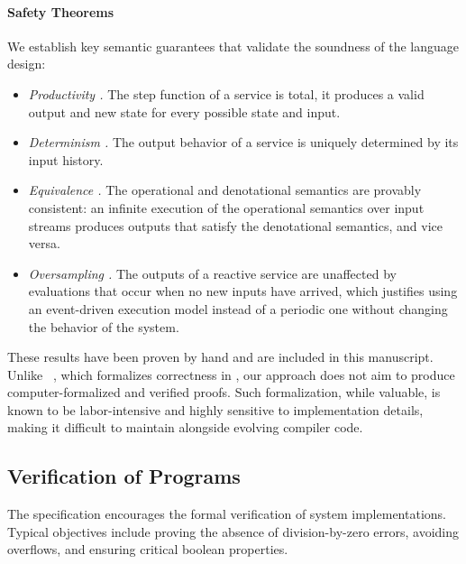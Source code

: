 \paragraph{Safety Theorems}
\label{sec:intro:contrib:semantics:thms}

We establish key semantic guarantees that validate the soundness of the language design:
%
\begin{itemize}
    \item \emph{Productivity .} The step function of
          a service is total, it produces a valid output and new state for every possible state and
          input.
    \item \emph{Determinism .} The output behavior of
          a service is uniquely determined by its input history.
    \item \emph{Equivalence .} The operational and
          denotational semantics are provably consistent: an infinite execution of the operational
          semantics over input streams produces outputs that satisfy the denotational semantics, and
          vice versa.
    \item \emph{Oversampling .} The outputs of a
          reactive service are unaffected by evaluations that occur when no new inputs have arrived,
          which justifies using an event-driven execution model instead of a periodic one without
          changing the behavior of the system.
\end{itemize}
%
These results have been proven by hand and are included in this manuscript. Unlike
\Velus~\cite{DBLP:conf/pldi/BourkeBDLPR17}, which formalizes correctness in \Rocq, our approach does not aim to
produce computer-formalized and verified proofs. Such formalization, while valuable, is known to be
labor-intensive and highly sensitive to implementation details, making it difficult to maintain
alongside evolving compiler code.

\subsection{Verification of \GRust Programs}
\label{sec:intro:contrib:greusot}

The \iso specification encourages the formal verification of \Asil system implementations. Typical
objectives include proving the absence of division-by-zero errors, avoiding overflows, and ensuring
critical boolean properties.

